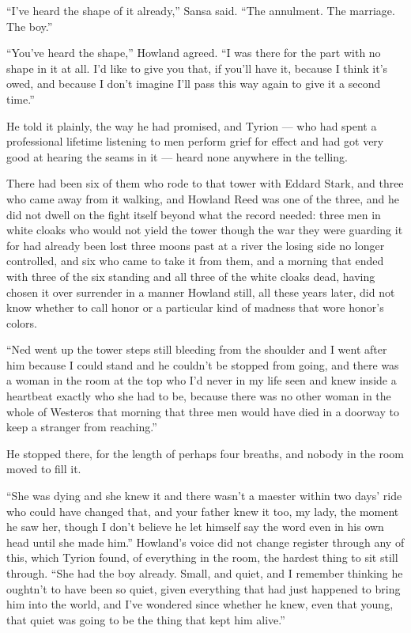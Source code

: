 “I’ve heard the shape of it already,” Sansa said. “The annulment. The marriage. The boy.”

“You’ve heard the shape,” Howland agreed. “I was there for the part with no shape in it at all. I’d like to give you that, if you’ll have it, because I think it’s owed, and because I don’t imagine I’ll pass this way again to give it a second time.”

\sceneBreak

He told it plainly, the way he had promised, and Tyrion — who had spent a professional lifetime listening to men perform grief for effect and had got very good at hearing the seams in it — heard none anywhere in the telling.

There had been six of them who rode to that tower with Eddard Stark, and three who came away from it walking, and Howland Reed was one of the three, and he did not dwell on the fight itself beyond what the record needed: three men in white cloaks who would not yield the tower though the war they were guarding it for had already been lost three moons past at a river the losing side no longer controlled, and six who came to take it from them, and a morning that ended with three of the six standing and all three of the white cloaks dead, having chosen it over surrender in a manner Howland still, all these years later, did not know whether to call honor or a particular kind of madness that wore honor’s colors.

“Ned went up the tower steps still bleeding from the shoulder and I went after him because I could stand and he couldn’t be stopped from going, and there was a woman in the room at the top who I’d never in my life seen and knew inside a heartbeat exactly who she had to be, because there was no other woman in the whole of Westeros that morning that three men would have died in a doorway to keep a stranger from reaching.”

He stopped there, for the length of perhaps four breaths, and nobody in the room moved to fill it.

“She was dying and she knew it and there wasn’t a maester within two days’ ride who could have changed that, and your father knew it too, my lady, the moment he saw her, though I don’t believe he let himself say the word even in his own head until she made him.” Howland’s voice did not change register through any of this, which Tyrion found, of everything in the room, the hardest thing to sit still through. “She had the boy already. Small, and quiet, and I remember thinking he oughtn’t to have been so quiet, given everything that had just happened to bring him into the world, and I’ve wondered since whether he knew, even that young, that quiet was going to be the thing that kept him alive.”

